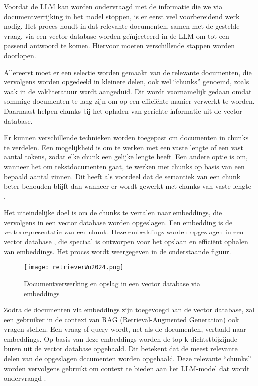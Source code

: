     
    Voordat de LLM kan worden ondervraagd met de informatie die we via documentverrijking in het model stoppen, is er eerst veel voorbereidend werk nodig. Het proces houdt in dat relevante documenten, samen met de gestelde vraag, via een vector database worden geïnjecteerd in de LLM om tot een passend antwoord te komen. Hiervoor moeten verschillende stappen worden doorlopen.
    
    Allereerst moet er een selectie worden gemaakt van de relevante documenten, die vervolgens worden opgedeeld in kleinere delen, ook wel “chunks” genoemd, zoals vaak in de vakliteratuur wordt aangeduid. Dit wordt voornamelijk gedaan omdat sommige documenten te lang zijn om op een efficiënte manier verwerkt te worden. Daarnaast helpen chunks bij het ophalen van gerichte informatie uit de vector database. 
    
    Er kunnen verschillende technieken worden toegepast om documenten in chunks te verdelen. Een mogelijkheid is om te werken met een vaste lengte of een vast aantal tokens, zodat elke chunk een gelijke lengte heeft. Een andere optie is om, wanneer het om tekstdocumenten gaat, te werken met chunks op basis van een bepaald aantal zinnen. Dit heeft als voordeel dat de semantiek van een chunk beter behouden blijft dan wanneer er wordt gewerkt met chunks van vaste lengte \autocite{Wang2024}.

    Het uiteindelijke doel is om de chunks te vertalen naar embeddings, die vervolgens in een vector database worden opgeslagen. Een embedding is de vectorrepresentatie van een chunk. Deze embeddings worden opgeslagen in een vector database \autocite{Wu2024}, die speciaal is ontworpen voor het opslaan en efficiënt ophalen van embeddings. Het proces wordt weergegeven in de onderstaande figuur.
   
     \begin{figure}[H]
        \centering
        \texttt{[image: retrieverWu2024.png]}
        \caption{Documentverwerking en opslag in een vector database via embeddings \cite{Wu2024}}
        \label{fig:RAG opmaken vector database}
    \end{figure}
    
    Zodra de documenten via embeddings zijn toegevoegd aan de vector database, zal een gebruiker in de context van RAG (Retrieval-Augmented Generation) ook vragen stellen. Een vraag of query wordt, net als de documenten, vertaald naar embeddings. Op basis van deze embeddings worden de top-k dichtstbijzijnde buren uit de vector database opgehaald. Dit betekent dat de meest relevante delen van de opgeslagen documenten worden opgehaald. Deze relevante “chunks” worden vervolgens gebruikt om context te bieden aan het LLM-model dat wordt ondervraagd \autocite{Wu2024}.
    
